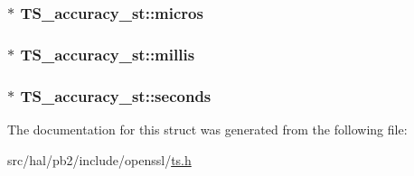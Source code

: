 \subsubsection[{\texorpdfstring{micros}{micros}}]{$\ast$ T\+S\+\_\+accuracy\+\_\+st\+::micros}\hypertarget{struct_t_s__accuracy__st_af1acda98f117fef39f799581bf37bb38}{}\label{struct_t_s__accuracy__st_af1acda98f117fef39f799581bf37bb38}
\subsubsection[{\texorpdfstring{millis}{millis}}]{$\ast$ T\+S\+\_\+accuracy\+\_\+st\+::millis}\hypertarget{struct_t_s__accuracy__st_a617d05085e9ab508437929ab86b6f4a3}{}\label{struct_t_s__accuracy__st_a617d05085e9ab508437929ab86b6f4a3}
\subsubsection[{\texorpdfstring{seconds}{seconds}}]{$\ast$ T\+S\+\_\+accuracy\+\_\+st\+::seconds}\hypertarget{struct_t_s__accuracy__st_a50d21da03ece4bf6c78f3fa96ffaae15}{}\label{struct_t_s__accuracy__st_a50d21da03ece4bf6c78f3fa96ffaae15}


The documentation for this struct was generated from the following file\+:\begin{DoxyCompactItemize}
\item 
src/hal/pb2/include/openssl/\hyperlink{ts_8h}{ts.\+h}\end{DoxyCompactItemize}
